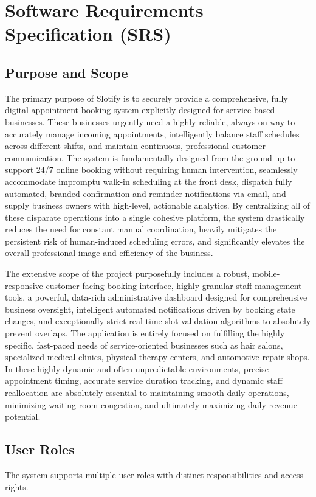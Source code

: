 \chapter{Software Requirements Specification (SRS)}

\section{Purpose and Scope}
The primary purpose of Slotify is to securely provide a comprehensive, fully digital appointment booking system explicitly designed for service-based businesses. These businesses urgently need a highly reliable, always-on way to accurately manage incoming appointments, intelligently balance staff schedules across different shifts, and maintain continuous, professional customer communication. The system is fundamentally designed from the ground up to support 24/7 online booking without requiring human intervention, seamlessly accommodate impromptu walk-in scheduling at the front desk, dispatch fully automated, branded confirmation and reminder notifications via email, and supply business owners with high-level, actionable analytics. By centralizing all of these disparate operations into a single cohesive platform, the system drastically reduces the need for constant manual coordination, heavily mitigates the persistent risk of human-induced scheduling errors, and significantly elevates the overall professional image and efficiency of the business.

The extensive scope of the project purposefully includes a robust, mobile-responsive customer-facing booking interface, highly granular staff management tools, a powerful, data-rich administrative dashboard designed for comprehensive business oversight, intelligent automated notifications driven by booking state changes, and exceptionally strict real-time slot validation algorithms to absolutely prevent overlaps. The application is entirely focused on fulfilling the highly specific, fast-paced needs of service-oriented businesses such as hair salons, specialized medical clinics, physical therapy centers, and automotive repair shops. In these highly dynamic and often unpredictable environments, precise appointment timing, accurate service duration tracking, and dynamic staff reallocation are absolutely essential to maintaining smooth daily operations, minimizing waiting room congestion, and ultimately maximizing daily revenue potential.

\section{User Roles}
The system supports multiple user roles with distinct responsibilities and access rights.

